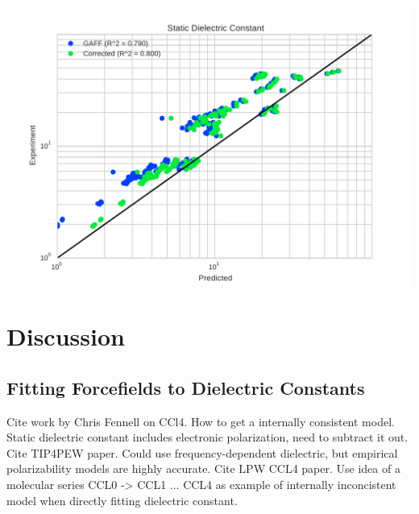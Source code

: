 \documentclass[aps,pre,twocolumn,superscriptaddress]{revtex4-1}
\begin{document}
\includegraphics[width=\columnwidth]{./figures/dielectrics_thermoml.pdf}


\section{Discussion}

\subsection{Fitting Forcefields to Dielectric Constants}

Cite work by Chris Fennell on CCl4.  How to get a internally consistent model.  Static dielectric constant includes electronic polarization, need to subtract it out.  Cite TIP4PEW paper.  Could use frequency-dependent dielectric, but empirical polarizability models are highly accurate.  Cite LPW CCL4 paper.  Use idea of a molecular series CCL0 -> CCL1 ... CCL4 as example of internally inconcistent model when directly fitting dielectric constant.
\end{document}
